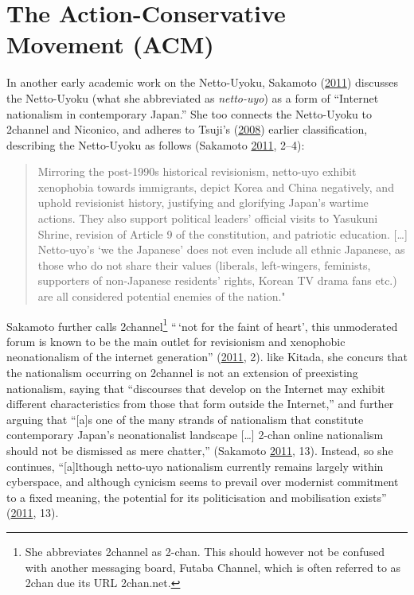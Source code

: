 \documentclass[10pt,british,A4paper,,openany]{memoir}
\begin{document}
\section{The Action-Conservative Movement
(ACM)}\label{the-action-conservative-movement-acm}

In another early academic work on the Netto-Uyoku, Sakamoto
(\protect\hyperlink{ref-sakamoto_koreans_2011}{2011}) discusses the
Netto-Uyoku (what she abbreviated as \emph{netto-uyo}) as a form of
``Internet nationalism in contemporary Japan.'' She too connects the
Netto-Uyoku to 2channel and Niconico, and adheres to Tsuji's
(\protect\hyperlink{ref-tsuji_eng:_2008}{2008}) earlier classification,
describing the Netto-Uyoku as follows (Sakamoto
\protect\hyperlink{ref-sakamoto_koreans_2011}{2011}, 2--4):

\begin{quote}
Mirroring the post-1990s historical revisionism, netto-uyo exhibit
xenophobia towards immigrants, depict Korea and China negatively, and
uphold revisionist history, justifying and glorifying Japan's wartime
actions. They also support political leaders' official visits to
Yasukuni Shrine, revision of Article 9 of the constitution, and
patriotic education. {[}\ldots{}{]} Netto-uyo's `we the Japanese' does
not even include all ethnic Japanese, as those who do not share their
values (liberals, left-wingers, feminists, supporters of non-Japanese
residents' rights, Korean TV drama fans etc.) are all considered
potential enemies of the nation."
\end{quote}

Sakamoto further calls 2channel\footnote{She abbreviates 2channel as
  2-chan. This should however not be confused with another messaging
  board, Futaba Channel, which is often referred to as 2chan due its URL
  2chan.net.} ``\,`not for the faint of heart', this unmoderated forum
is known to be the main outlet for revisionism and xenophobic
neonationalism of the internet generation''
(\protect\hyperlink{ref-sakamoto_koreans_2011}{2011}, 2). like Kitada,
she concurs that the nationalism occurring on 2channel is not an
extension of preexisting nationalism, saying that ``discourses that
develop on the Internet may exhibit different characteristics from those
that form outside the Internet,'' and further arguing that ``{[}a{]}s
one of the many strands of nationalism that constitute contemporary
Japan's neonationalist landscape {[}\ldots{}{]} 2-chan online
nationalism should not be dismissed as mere chatter,'' (Sakamoto
\protect\hyperlink{ref-sakamoto_koreans_2011}{2011}, 13). Instead, so
she continues, ``{[}a{]}lthough netto-uyo nationalism currently remains
largely within cyberspace, and although cynicism seems to prevail over
modernist commitment to a fixed meaning, the potential for its
politicisation and mobilisation exists''
(\protect\hyperlink{ref-sakamoto_koreans_2011}{2011}, 13).
\end{document}
